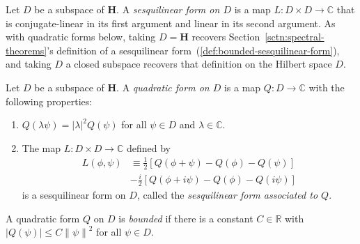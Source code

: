 \begin{definition}
    \label{def:hall-sesquilinear-form-on-a-subspace}
    \leanok
    Let $D$ be a subspace of $\mathbf{H}$. A \textit{sesquilinear form on $D$} is a map $L : D \times D \to \mathbb{C}$ that is conjugate-linear in its first argument and linear in its second argument. As with quadratic forms below, taking $D = \mathbf{H}$ recovers Section~\ref{sctn:spectral-theorems}'s definition of a sesquilinear form~(\ref{def:bounded-sesquilinear-form}), and taking $D$ a closed subspace recovers that definition on the Hilbert space $D$.
\end{definition}

\begin{definition}
    \label{def:hall-quadratic-form-on-a-subspace}
    \leanok
    Let $D$ be a subspace of $\mathbf{H}$. A \textit{quadratic form on $D$} is a map $Q : D \to \mathbb{C}$ with the following properties:
    \begin{enumerate}
        \item $Q(\lambda\psi) = \lvert \lambda \rvert^2 Q(\psi)$ for all $\psi \in D$ and $\lambda \in \mathbb{C}$.
        \item The map $L : D \times D \to \mathbb{C}$ defined by
        \begin{align}
            L(\phi, \psi) &\equiv \frac{1}{2} \left[ Q(\phi + \psi) - Q(\phi) - Q(\psi) \right] \\
                          &-\frac{i}{2} \left[ Q(\phi + i\psi) - Q(\phi) - Q(i\psi) \right]
        \end{align}
        is a sesquilinear form on $D$, called the \textit{sesquilinear form associated to $Q$}.
    \end{enumerate}
    A quadratic form $Q$ on $D$ is \textit{bounded} if there is a constant $C \in \mathbb{R}$ with $\lvert Q(\psi) \rvert \le C\left\| \psi \right\|^2$ for all $\psi \in D$.


\end{definition}
